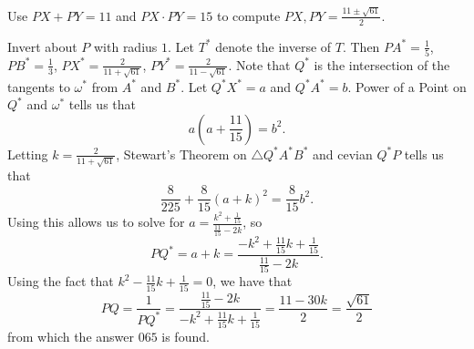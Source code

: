 Use $PX+PY=11$ and $PX\cdot PY=15$ to compute $PX,PY=\frac{11\pm\sqrt{61}}{2}$.

Invert about $P$ with radius $1$. Let $T^*$ denote the inverse of $T$. Then $PA^*=\frac{1}{5}$, $PB^*=\frac{1}{3}$, $PX^*=\frac{2}{11+\sqrt{61}}$, $PY^*=\frac{2}{11-\sqrt{61}}$. Note that $Q^*$ is the intersection of the tangents to $\omega^*$ from $A^*$ and $B^*$. Let $Q^*X^*=a$ and $Q^*A^*=b$. Power of a Point on $Q^*$ and $\omega^*$ tells us that \[a\left(a+\frac{11}{15}\right)=b^2.\] Letting $k=\frac{2}{11+\sqrt{61}}$, Stewart's Theorem on $\triangle{Q^*A^*B^*}$ and cevian $Q^*P$ tells us that \[\frac{8}{225}+\frac{8}{15}\left(a+k\right)^2=\frac{8}{15}b^2.\] Using this allows us to solve for $a=\frac{k^2+\frac{1}{15}}{\frac{11}{15}-2k}$, so \[PQ^*=a+k=\frac{-k^2+\frac{11}{15}k+\frac{1}{15}}{\frac{11}{15}-2k}.\] Using the fact that $k^2-\frac{11}{15}k+\frac{1}{15}=0$, we have that \[PQ=\frac{1}{PQ^*}=\frac{\frac{11}{15}-2k}{-k^2+\frac{11}{15}k+\frac{1}{15}}=\frac{11-30k}{2}=\frac{\sqrt{61}}{2}\] from which the answer $\boxed{065}$ is found.